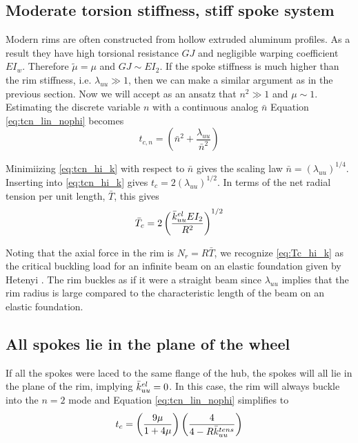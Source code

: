 \documentclass[\rootdir/thesis.tex]{subfiles}
\begin{document}
\subsection{Moderate torsion stiffness, stiff spoke system}
Modern rims are often constructed from hollow extruded aluminum profiles. As a result they have high torsional resistance $GJ$ and negligible warping coefficient $EI_w$. Therefore $\tilde{\mu} = \mu$ and $GJ \sim EI_2$. If the spoke stiffness is much higher than the rim stiffness, i.e. $\lambda_{uu} \gg 1$, then we can make a similar argument as in the previous section. Now we will accept as an ansatz that $n^2 \gg 1$ and $\mu \sim 1$. Estimating the discrete variable $n$ with a continuous analog $\bar{n}$ Equation \eqref{eq:tcn_lin_nophi} becomes
\begin{equation}
\label{eq:tcn_hi_k}
t_{c,n} = \left(\bar{n}^2 + \frac{\lambda_{uu}}{\bar{n}^2}\right)
\end{equation}

Minimiizing \eqref{eq:tcn_hi_k} with respect to $\bar{n}$ gives the scaling law $\bar{n}=(\lambda_{uu})^{1/4}$. Inserting into \eqref{eq:tcn_hi_k} gives $t_c = 2(\lambda_{uu})^{1/2}$. In terms of the net radial tension per unit length, $\bar{T}$, this gives
\begin{equation}
\label{eq:Tc_hi_k}
\bar{T}_c = 2 \left(\frac{\bar{k}_{uu}^{el}EI_2}{R^2}\right)^{1/2}
\end{equation}

Noting that the axial force in the rim is $N_r=R\bar{T}$, we recognize \eqref{eq:Tc_hi_k} as the critical buckling load for an infinite beam on an elastic foundation given by Hetenyi \cite{Hetenyi1946}. The rim buckles as if it were a straight beam since $\lambda_{uu}$ implies that the rim radius is large compared to the characteristic length of the beam on an elastic foundation.

\subsection{All spokes lie in the plane of the wheel}

If all the spokes were laced to the same flange of the hub, the spokes will all lie in the plane of the rim, implying $\bar{k}_{uu}^{el}=0$. In this case, the rim will always buckle into the $n=2$ mode and Equation \eqref{eq:tcn_lin_nophi} simplifies to
\begin{equation}
t_c = \left(\frac{9\mu}{1 + 4\mu}\right)\left(\frac{4}{4 - R\bar{k}_{uu}^{tens}}\right)
\end{equation}
\end{document}
